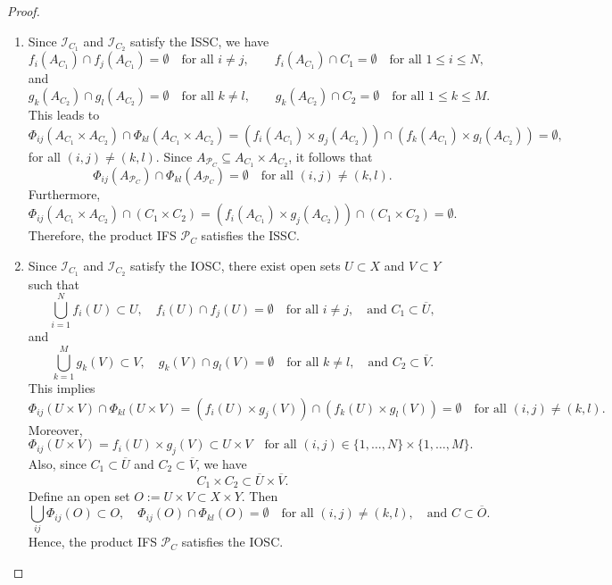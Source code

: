 \documentclass[12pt,oneside,reqno]{amsart}
\theoremstyle{definition}
\theoremstyle{remark}
\begin{document}
\begin{proof}
    \begin{enumerate}
        \item Since $\mathcal{I}_{C_1}$ and $\mathcal{I}_{C_2}$ satisfy the ISSC, we have 
        \[
        f_i(A_{C_1}) \cap f_j(A_{C_1}) = \emptyset \quad \text{for all } i \neq j, \qquad f_i(A_{C_1}) \cap C_1 = \emptyset \quad \text{for all } 1 \le i \le N,
        \]
        and
        \[
        g_k(A_{C_2}) \cap g_l(A_{C_2}) = \emptyset \quad \text{for all } k \neq l, \qquad g_k(A_{C_2}) \cap C_2 = \emptyset \quad \text{for all } 1 \le k \le M.
        \]
        This leads to
        \[
        \Phi_{ij}(A_{C_1} \times A_{C_2}) \cap \Phi_{kl}(A_{C_1} \times A_{C_2}) = (f_i(A_{C_1}) \times g_j(A_{C_2})) \cap (f_k(A_{C_1}) \times g_l(A_{C_2})) = \emptyset,
        \]
        for all $(i,j) \neq (k,l)$. Since $A_{\mathcal{P}_C} \subseteq A_{C_1} \times A_{C_2}$, it follows that
        \[
        \Phi_{ij}(A_{\mathcal{P}_C}) \cap \Phi_{kl}(A_{\mathcal{P}_C}) = \emptyset \quad \text{for all } (i,j) \neq (k,l).
        \]
        Furthermore,
        \[
        \Phi_{ij}(A_{C_1} \times A_{C_2}) \cap (C_1 \times C_2) = (f_i(A_{C_1}) \times g_j(A_{C_2})) \cap (C_1 \times C_2) = \emptyset.
        \]
        Therefore, the product IFS $\mathcal{P}_{C}$ satisfies the ISSC.

        \item Since $\mathcal{I}_{C_1}$ and $\mathcal{I}_{C_2}$ satisfy the IOSC, there exist open sets $U \subset X$ and $V \subset Y$ such that
        \[
        \bigcup_{i=1}^N f_i(U) \subset U, \quad f_i(U) \cap f_j(U) = \emptyset \quad \text{for all } i \neq j, \quad \text{and } C_1 \subset \overline{U},
        \]
        and
        \[
        \bigcup_{k=1}^M g_k(V) \subset V, \quad g_k(V) \cap g_l(V) = \emptyset \quad \text{for all } k \neq l, \quad \text{and } C_2 \subset \overline{V}.
        \]
        This implies
        \[
        \Phi_{ij}(U \times V) \cap \Phi_{kl}(U \times V) = (f_i(U) \times g_j(V)) \cap (f_k(U) \times g_l(V)) = \emptyset \quad \text{for all } (i,j) \neq (k,l).
        \]
        Moreover,
        \[
        \Phi_{ij}(U \times V) = f_i(U) \times g_j(V) \subset U \times V \quad \text{for all } (i,j) \in \{1, \ldots, N\} \times \{1, \ldots, M\}.
        \]
        Also, since $C_1 \subset \overline{U}$ and $C_2 \subset \overline{V}$, we have
        \[
        C_1 \times C_2 \subset \overline{U} \times \overline{V}.
        \]
        Define an open set $O:= U \times V \subset X \times Y$. Then
        \[
        \bigcup_{ij} \Phi_{ij}(O) \subset O, \quad \Phi_{ij}(O) \cap \Phi_{kl}(O) = \emptyset \quad \text{for all } (i,j) \neq (k,l), \quad \text{and } C \subset \overline{O}.
        \]
        Hence, the product IFS $\mathcal{P}_C$ satisfies the IOSC.
    \end{enumerate}
\end{proof}
\end{document}
